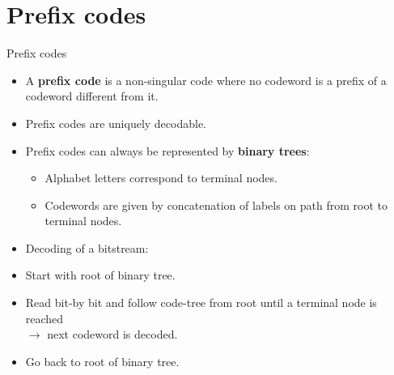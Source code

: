\section{Prefix codes}
\begin{frame}{Prefix codes}
\begin{itemize}
\item A \textbf{prefix code} is a non-singular code where no codeword is a prefix of a codeword different from it.
\item Prefix codes are uniquely decodable.
\end{itemize}
\begin{itemize} 
\item Prefix codes can always be represented by \textbf{binary trees}: 
\begin{itemize} 
\item Alphabet letters correspond to terminal nodes. 
\item Codewords are given by concatenation of labels on path from root to terminal nodes. 
\end{itemize}
\item Decoding of a bitstream: 
\bit
\item Start with root of binary tree. 
\item Read bit-by bit and follow code-tree from root until a terminal node is reached \\ $\rightarrow$ next codeword is decoded. 
\item Go back to root of binary tree.   
\eit
\end{itemize}
\end{frame}


